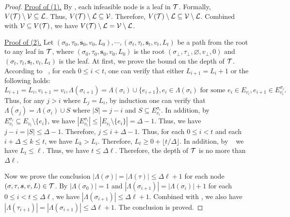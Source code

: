 \documentclass[11pt]{article}
\newcommand{\abs}[1]{\left\vert#1\right\vert}
\newcommand{\seqS}{\boldsymbol{s}}
\begin{document}
\begin{proof}
    \underline{Proof of (1).} By ,  each infeasible node is a leaf in $\mathcal{T}$.
    Formally, $V(\mathcal{T}) \setminus \mathcal{V} \subseteq \mathcal{L}$.
    Thus,  $V(\mathcal{T}) \setminus \mathcal{L} \subseteq \mathcal{V}$.
    Therefore, $V(\mathcal{T}) \setminus \mathcal{L} \subseteq \mathcal{V}\setminus \mathcal{L}$.
    Combined with $\mathcal{V}\subseteq V(\mathcal{T})$, we have $V(\mathcal{T}) \setminus \mathcal{L} = \mathcal{V}\setminus \mathcal{L}$.
    \vspace{0.2cm}
    
    \underline{Proof of (2).} 
    Let $(\sigma_0,\tau_0,\seqS_0,v_0,L_0),\cdots,(\sigma_t,\tau_t,\seqS_t,v_t,L_t)$ be a path from the root to any leaf in $\mathcal{T}$, where $(\sigma_0,\tau_0,\seqS_0,v_0,L_0)$ is the root $(\sigma_\bot, \tau_\bot, \varnothing, v_\bot, 0)$ and $(\sigma_t,\tau_t,\seqS_t,v_t,L_t)$ is the leaf.
    At first, we prove the bound on the depth of $\mathcal{T}$.
    According to ~, for each $0\leq i <t$, one can verify that either $L_{i+1}= L_{i} + 1$ or the following holds:
    \[L_{i+1} = L_{i}, v_{i+1} = v_{i}, \Lambda(\sigma_{i+1}) = \Lambda(\sigma_{i})\cup \{e_{i+1}\}, e_{i}\in \Lambda(\sigma_{i}) \text{ for some } e_{i}\in E_{v_i},e_{i+1}\in E^{\sigma_i}_{v_i}.\]
    Thus, for any $j>i$ where $L_j = L_i$, by induction
    one can verify that  
    $\Lambda(\sigma_{j}) = \Lambda(\sigma_{i})\cup S$ where $\abs{S} = j-i$ and $S\subseteq E^{\sigma_i}_{v_i}$. 
    In addition, by $E^{\sigma_i}_{v_i}\subseteq E_{v_i} \setminus \{e_i\}$, we have $\abs{E^{\sigma_i}_{v_i}}\leq \abs{E_{v_i}\setminus \{e_i\}} = \Delta - 1$.
    Thus, we have $j - i= \abs{S} \leq \Delta - 1$.
    Therefore, $j\leq i+\Delta - 1$.
    Thus, for each $0\leq i <t$ and each $i+\Delta \leq k\leq t$, we have $L_{k}>L_{i}$.
    Therefore, $L_{t}\geq 0 + \lfloor t/\Delta\rfloor$.
    In addition, by ~ we have $L_t\leq \ell$.
    Thus, we have $t\leq \Delta\ell$.
    Therefore, the depth of $\mathcal{T}$ is no more than $\Delta\ell$.

    Now we prove the conclusion $\abs{\Lambda(\sigma)} = \abs{\Lambda(\tau)} \leq \Delta \ell + 1$ for each node $(\sigma,\tau,\seqS,v,L)\in \+T$.
    By $\abs{\Lambda(\sigma_{0})} = 1$ and $\abs{\Lambda(\sigma_{i+1})} = \abs{\Lambda(\sigma_{i})} + 1$ for each 
    $0\leq i <t \leq \Delta\ell$, we have $\abs{\Lambda(\sigma_{i+1})} \leq \Delta\ell + 1$.
    Combined with ,
    we also have $\abs{\Lambda(\tau_{i+1})} = \abs{\Lambda(\sigma_{i+1})} \leq \Delta\ell + 1$. 
    The conclusion is proved.


\end{proof}
\end{document}
